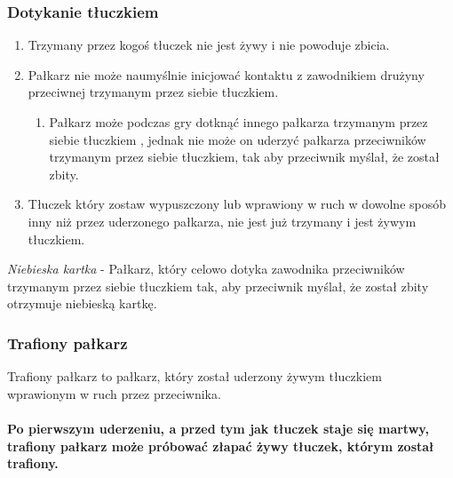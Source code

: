 \documentclass[12pt]{article}
\begin{document}
\subsubsection{Dotykanie tłuczkiem}

\begin{enumerate}
\item
  Trzymany przez kogoś tłuczek nie jest żywy i nie powoduje zbicia.
\item
  Pałkarz nie może naumyślnie inicjować kontaktu z zawodnikiem drużyny
  przeciwnej trzymanym przez siebie tłuczkiem.

  \begin{enumerate}
  \item
        Pałkarz może podczas gry dotknąć innego pałkarza trzymanym przez
    siebie tłuczkiem , jednak nie może on uderzyć pałkarza przeciwników
    trzymanym przez siebie tłuczkiem, tak aby przeciwnik myślał, że
    został zbity.
      \end{enumerate}
\item
    Tłuczek który zostaw wypuszczony lub wprawiony w ruch w dowolne sposób
  inny niż przez uderzonego pałkarza, nie jest już trzymany i jest żywym
  tłuczkiem.
  \end{enumerate}

\emph{Niebieska kartka} - Pałkarz, który celowo dotyka zawodnika
przeciwników trzymanym przez siebie tłuczkiem tak, aby przeciwnik
myślał, że został zbity otrzymuje niebieską kartkę.

\subsubsection{Trafiony pałkarz}

Trafiony pałkarz to pałkarz, który został uderzony żywym tłuczkiem
wprawionym w ruch przez przeciwnika.

\paragraph{Po pierwszym uderzeniu, a przed tym jak tłuczek staje
się martwy, trafiony pałkarz może próbować złapać żywy tłuczek, którym
został trafiony.}
\end{document}
